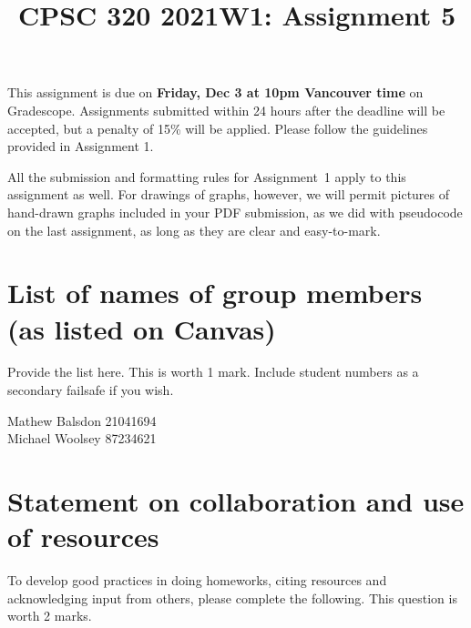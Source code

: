 \documentclass[11pt]{article}
\author{}
\date{}
\begin{document}
\title{CPSC 320 2021W1: Assignment 5}

\maketitle
\vspace{-0.5in}

This assignment is due on \textbf{Friday, Dec 3 at 10pm Vancouver time} on Gradescope. Assignments submitted within 24 hours after the deadline will be accepted, but a penalty of 15\% will be applied. Please follow the guidelines provided in Assignment 1.

All the submission and formatting rules for Assignment~1 apply to
this assignment as well.  For drawings of graphs, however, we will permit
pictures of hand-drawn graphs included in your PDF submission, as we did
with pseudocode on the last assignment, as long as they are clear and
easy-to-mark.

\section{List of names of group members (as listed on Canvas)}

Provide the list here. This is worth 1 mark. Include student numbers
as a secondary failsafe if you wish.

\begin{soln}
Mathew Balsdon 21041694 \\
Michael Woolsey 87234621
\end{soln}

\section{Statement on collaboration and use of resources}
To develop good practices in doing homeworks,
citing resources and acknowledging input from others, please complete the following.
This question is worth 2 marks.
\end{document}
